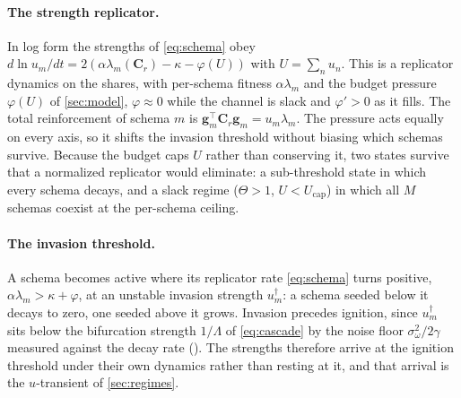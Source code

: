 \documentclass[
  aps,prx,
  reprint,
  superscriptaddress,
  nofootinbib,
  longbibliography
]{revtex4-2}
\newcommand{\g}{\mathbf{g}}
\newcommand{\Cr}{\mathbf{C}_r}
\newcommand{\sidn}{\sigma_{\omega}}
\newcommand{\smref}[1]{\cite[Sec.~#1]{SM}}
\begin{document}
\paragraph{The strength replicator.} In log form the strengths of \cref{eq:schema} obey $d\ln u_m/dt=2(\alpha\lambda_m(\Cr)-\kappa-\varphi(U))$ with $U=\sum_nu_n$. This is a replicator dynamics on the shares, with per-schema fitness $\alpha\lambda_m$ \cite{touzel2026fitnesslandscapesocialnorms,Gintis2010} and the budget pressure $\varphi(U)$ of \cref{sec:model}, $\varphi\approx0$ while the channel is slack and $\varphi'>0$ as it fills. The total reinforcement of schema $m$ is $\g_m^{\!\top}\Cr\g_m=u_m\lambda_m$. The pressure acts equally on every axis, so it shifts the invasion threshold without biasing which schemas survive. Because the budget caps $U$ rather than conserving it, two states survive that a normalized replicator would eliminate: a sub-threshold state in which every schema decays, and a slack regime ($\Theta>1$, $U<U_{\mathrm{cap}}$) in which all $M$ schemas coexist at the per-schema ceiling.

\paragraph{The invasion threshold.} A schema becomes active where its replicator rate \cref{eq:schema} turns positive, $\alpha\lambda_m>\kappa+\varphi$, at an unstable invasion strength $u_m^\dagger$: a schema seeded below it decays to zero, one seeded above it grows. Invasion precedes ignition, since $u_m^\dagger$ sits below the bifurcation strength $1/\Lambda$ of \cref{eq:cascade} by the noise floor $\sidn^2/2\gamma$ measured against the decay rate (\smref{S6}). The strengths therefore arrive at the ignition threshold under their own dynamics rather than resting at it, and that arrival is the $u$-transient of \cref{sec:regimes}.
\end{document}
